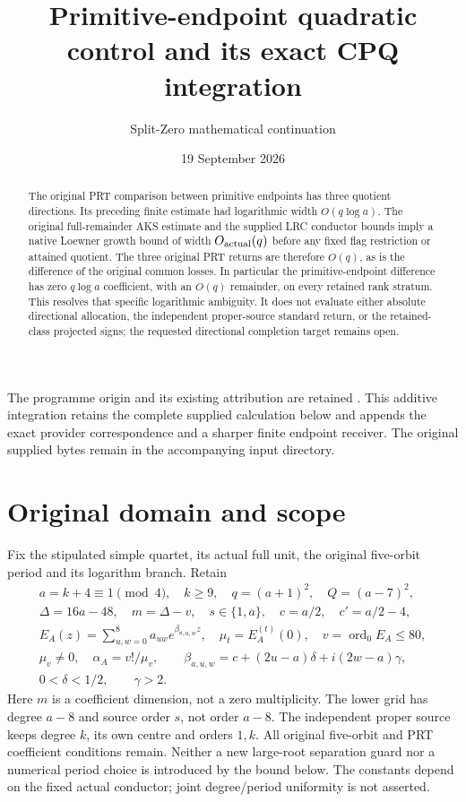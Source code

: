 \documentclass[11pt,a4paper]{article}
\title{Primitive-endpoint quadratic control and its exact CPQ integration}
\author{Split-Zero mathematical continuation}
\date{19 September 2026}
\begin{document}
\maketitle
\begin{abstract}
The original PRT comparison between primitive endpoints has three quotient directions. Its preceding finite estimate had logarithmic width $O(q\log a)$. The original full-remainder AKS estimate and the supplied LRC conductor bounds imply a native Loewner growth bound of width $O_{\rm actual}(q)$ before any fixed flag restriction or attained quotient. The three original PRT returns are therefore $O(q)$, as is the difference of the original common losses. In particular the primitive-endpoint difference has zero $q\log a$ coefficient, with an $O(q)$ remainder, on every retained rank stratum. This resolves that specific logarithmic ambiguity. It does not evaluate either absolute directional allocation, the independent proper-source standard return, or the retained-class projected signs; the requested directional completion target remains open.
\end{abstract}

The programme origin and its existing attribution are retained
\cite{human:globalization2026,human:splitzero2026}. This additive
integration retains the complete supplied calculation below and appends
the exact provider correspondence and a sharper finite endpoint receiver.
The original supplied bytes remain in the accompanying input directory.

\section{Original domain and scope}
Fix the stipulated simple quartet, its actual full unit, the original five-orbit period and its logarithm branch. Retain
\begin{equation}
\begin{gathered}
 a=k+4\equiv1\pmod4,\quad k\ge9,\quad q=(a+1)^2,\quad Q=(a-7)^2,\\
 \Delta=16a-48,\quad m=\Delta-v,\quad s\in\{1,a\},\quad
 c=a/2,\quad c'=a/2-4,\\
 E_A(z)=\sum_{u,w=0}^8a_{uw}e^{\beta_{8,u,w}z},\quad
 \mu_t=E_A^{(t)}(0),\quad v=\operatorname{ord}_0E_A\le80,\\
 \mu_v\ne0,\quad \alpha_A=v!/\mu_v,\qquad
 \beta_{a,u,w}=c+(2u-a)\delta+i(2w-a)\gamma,\\
 0<\delta<1/2,\qquad\gamma>2.
\end{gathered}\label{peq:data}
\end{equation}
Here $m$ is a coefficient dimension, not a zero multiplicity. The lower grid has degree $a-8$ and source order $s$, not order $a-8$. The independent proper source keeps degree $k$, its own centre and orders $1,k$. All original five-orbit and PRT coefficient conditions remain. Neither a new large-root separation guard nor a numerical period choice is introduced by the bound below. The constants depend on the fixed actual conductor; joint degree/period uniformity is not asserted.
\end{document}
